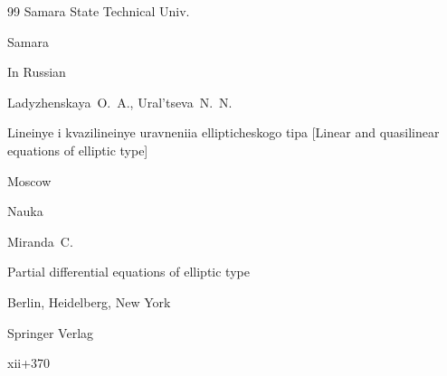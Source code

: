 \begin{thebibliography}{99}
\publ Samara State Technical Univ.

\publaddr Samara






\lang In Russian




\by Ladyzhenskaya~O.~A., Ural'tseva~N.~N.

\book Lineinye i kvazilineinye uravneniia ellipticheskogo tipa \rm [Linear and quasilinear equations of elliptic type]

\publaddr Moscow

\publ Nauka









\by Miranda~C.

\book Partial differential equations of elliptic type

\publaddr Berlin, Heidelberg, New York

\publ Springer Verlag 

\totalpages xii+370 




\end{thebibliography}



\EngDate





\renewcommand{\baselinestretch}{0.9}





\newpage \Russian



%

%

%

